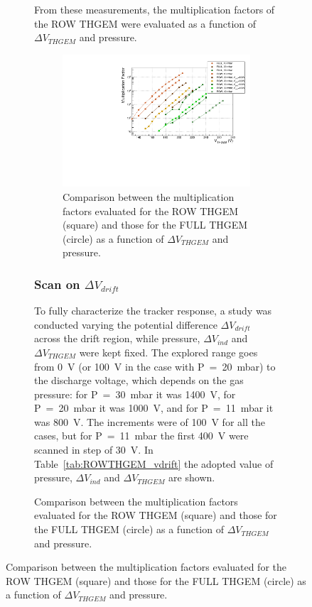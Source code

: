 \documentclass[a4paper, 11 pt]{article}
\newcommand{\Vind}{$\Delta V_{ind}$}
\newcommand{\Vthgem}{$\Delta V_{THGEM}$}
\newcommand{\Vdrift}{$ \Delta V_{drift}$}
\begin{document}
\begin{figure}[htbp]
\begin{figure}[htbp]
From these measurements, the multiplication factors of the ROW THGEM were evaluated as a function of \Vthgem{} and pressure. 




\begin{figure}[!t]
	\centering
	\includegraphics[width=\textwidth]{Immagini/MFvsTHGEM_FULLandROW_bis.pdf}
	\caption{Comparison between the multiplication factors evaluated for the ROW THGEM (square) and those for the FULL THGEM (circle) as a function of \Vthgem{} and pressure.}
	\label{fig:multiplication_factor_FULLandROW}
\end{figure}










\clearpage

\subsubsection{Scan on \Vdrift}

To fully characterize the tracker response, a study was conducted varying the potential difference \Vdrift{} across the drift region, while pressure, \Vind{} and \Vthgem{} were kept fixed.
The explored range goes from 0~V (or 100~V in the case with P~=~20~mbar) to the discharge voltage, which depends on the gas pressure: for P~=~30~mbar it was 1400~V, for P~=~20~mbar it was 1000~V, and for P~=~11~mbar it was 800~V.
The increments were of 100~V for all the cases, but for P~=~11~mbar the first 400~V were scanned in step of 30~V.
In Table~\ref{tab:ROWTHGEM_vdrift} the adopted value of pressure, \Vind{} and \Vthgem{} are shown.



\end{figure}
\end{figure}
\end{document}
